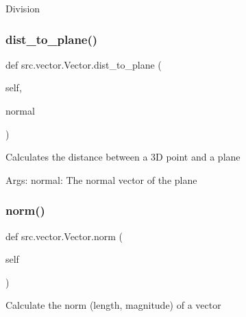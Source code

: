 \begin{DoxyVerb}Division\end{DoxyVerb}
 \mbox{\label{classsrc_1_1vector_1_1Vector_af038a360252680d587ea272804bbee80}} 
\subsubsection{\texorpdfstring{dist\+\_\+to\+\_\+plane()}{dist\_to\_plane()}}
{\footnotesize\ttfamily def src.\+vector.\+Vector.\+dist\+\_\+to\+\_\+plane (\begin{DoxyParamCaption}\item[{}]{self,  }\item[{}]{normal }\end{DoxyParamCaption})}

\begin{DoxyVerb}Calculates the distance between a 3D point and a plane

Args:
    normal: The normal vector of the plane
\end{DoxyVerb}
 \mbox{\label{classsrc_1_1vector_1_1Vector_a989ee5f9062c515ed2d2cfab3229c903}} 
\subsubsection{\texorpdfstring{norm()}{norm()}}
{\footnotesize\ttfamily def src.\+vector.\+Vector.\+norm (\begin{DoxyParamCaption}\item[{}]{self }\end{DoxyParamCaption})}

\begin{DoxyVerb}Calculate the norm (length, magnitude) of a vector\end{DoxyVerb}
 \mbox{\label{classsrc_1_1vector_1_1Vector_aaca4ddfa8442cd4f0206919fe392d5fc}} 
